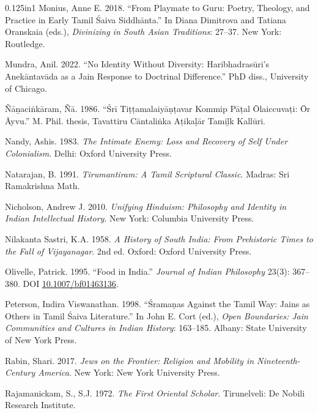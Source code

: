 \begin{hangparas}{0.125in}{1}
	\label{Monius2018}Monius, Anne E. 2018. “From Playmate to Guru: Poetry, Theology, and Practice in Early Tamil Śaiva Siddhānta.” In Diana Dimitrova and Tatiana Oranskaia (eds.), \emph{Divinizing in South Asian Traditions}: 27–37. New York: Routledge.\medskip


	\label{Mundra2022}Mundra, Anil. 2022. “No Identity Without Diversity: Haribhadrasūri’s Anekāntavāda as a Jain Response to Doctrinal Difference.” PhD diss., University of Chicago.\medskip


	\label{Nanacinkaram1986}Ñāṉaciṅkāram, Ñā. 1986. “Śrī Tiṭṭamalaiyāṇṭavar Kommip Pāṭal Ōlaiccuvaṭi: Ōr Āyvu.” M. Phil. thesis, Tavattiru Cāntaliṅka Aṭikaḷār Tamiḻk Kallūri. \medskip


	\label{Nandy1983}Nandy, Ashis. 1983. \emph{The Intimate Enemy: Loss and Recovery of Self Under Colonialism}. Delhi: Oxford University Press.\medskip


	\label{Natarajan1991}Natarajan, B. 1991. \emph{Tirumantiram: A Tamil Scriptural Classic}. Madras: Sri Ramakrishna Math.\medskip


	\label{Nicholson2010}Nicholson, Andrew J. 2010. \emph{Unifying Hinduism: Philosophy and Identity in Indian Intellectual History}. New York: Columbia University Press.\medskip


	\label{NilakantaSastri1958}Nilakanta Sastri, K.A. 1958. \emph{A History of South India: From Prehistoric Times to the Fall of Vijayanagar}. 2nd ed. Oxford: Oxford University Press.\medskip


	\label{Olivelle1995}Olivelle, Patrick. 1995. “Food in India.” \emph{Journal of Indian Philosophy} 23(3): 367–380. DOI \href{https://doi.org/10.1007/bf01463136}{10.1007/bf01463136}.\medskip


	\label{Peterson1998}Peterson, Indira Viswanathan. 1998. “Śramaṇas Against the Tamil Way: Jains as Others in Tamil Śaiva Literature.” In John E. Cort (ed.), \emph{Open Boundaries: Jain Communities and Cultures in Indian History}: 163–185. Albany: State University of New York Press.\medskip


	\label{Rabin2017}Rabin, Shari. 2017. \emph{Jews on the Frontier: Religion and Mobility in Nineteenth-Century America}. New York: New York University Press.\medskip


	\label{Rajamanickam1972}Rajamanickam, S., S.\thinskip{}J. 1972. \emph{The First Oriental Scholar}. Tirunelveli: De Nobili Research Institute.\medskip



\end{hangparas}
